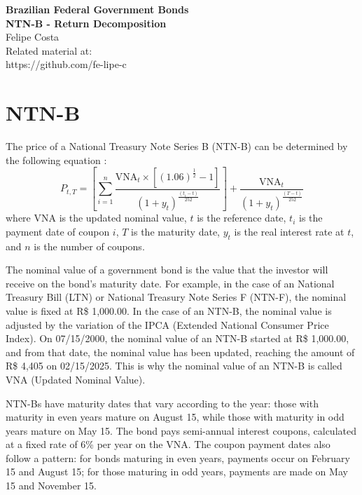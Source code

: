 \documentclass[10pt]{report}
\newcommand{\DOI}{https://github.com/fe-lipe-c}
\begin{document}
\begin{titlepage}
	\begin{flushright}
		\LARGE{\textbf{Brazilian Federal Government Bonds}}\\
		\vfill
		\Huge{\textbf{NTN-B - Return Decomposition}}\\
		\vfill
		\large Felipe Costa\\
		\vfill
		\normalsize Related material at:\\
		\DOI
		\vfill
	\end{flushright}
\end{titlepage}


\pagebreak

\section*{NTN-B}

The price of a National Treasury Note Series B (NTN-B) can be determined by the following equation \cite{jose_valentim}:
\begin{equation}
	P_{t,T} = \left[\sum_{i=1}^{n} \frac{\text{VNA}_{t} \times \left[(1.06)^{\frac{1}{2}}-1\right]}{(1+y_{t})^\frac{(t_{i}-t)}{252}}\right] + \frac{\text{VNA}_{t}}{(1+y_{t})^\frac{(T-t)}{252}}
\end{equation}
where VNA is the updated nominal value, $t$ is the reference date, $t_{i}$ is the payment date of coupon $i$, $T$ is the maturity date, $y_{t}$ is the real interest rate at $t$, and $n$ is the number of coupons.

The nominal value of a government bond is the value that the investor will receive on the bond's maturity date. For example, in the case of an National Treasury Bill (LTN) or National Treasury Note Series F (NTN-F), the nominal value is fixed at R\$ 1,000.00. In the case of an NTN-B, the nominal value is adjusted by the variation of the IPCA (Extended National Consumer Price Index). On 07/15/2000, the nominal value of an NTN-B started at R\$ 1,000.00, and from that date, the nominal value has been updated, reaching the amount of R\$ 4,405 on 02/15/2025. This is why the nominal value of an NTN-B is called VNA (Updated Nominal Value).

NTN-Bs have maturity dates that vary according to the year: those with maturity in even years mature on August 15, while those with maturity in odd years mature on May 15. The bond pays semi-annual interest coupons, calculated at a fixed rate of 6\% per year on the VNA. The coupon payment dates also follow a pattern: for bonds maturing in even years, payments occur on February 15 and August 15; for those maturing in odd years, payments are made on May 15 and November 15.
\end{document}
